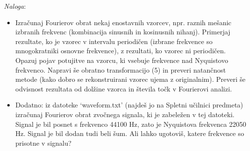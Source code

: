 \documentclass[slovene,11pt,a4paper]{article}
\begin{document}
{\it Naloga\/}:
\begin{itemize}

\item Izračunaj Fourierov obrat nekaj enostavnih vzorcev, npr. raznih mešanic izbranih frekvenc
(kombinacija sinusnih in kosinusnih nihanj). Primerjaj rezultate, ko je vzorec v intervalu periodičen
(izbrane frekvence so mnogokratniki osnovne frekvence), z rezultati, ko vzorec ni periodičen.
Opazuj pojav potujitve na vzorcu, ki vsebuje frekvence nad Nyquistovo frekvenco. Napravi še obratno
transformacijo (5) in preveri natančnost metode (kako dobro se rekonstruirani vzorec ujema z originalnim).
Preveri še odvisnost rezultata od dolžine vzorca in števila točk v Fourierovi analizi.
\item Dodatno: iz datoteke `waveform.txt' (najdeš jo na Spletni učilnici predmeta) izračunaj
Fourierov obrat zvočnega signala, ki je zabeležen v tej datoteki. Signal je bil posnet s frekvenco
44100 Hz, zato je Nyquistova frekvenca 22050 Hz. Signal je bil dodan tudi beli šum. Ali lahko ugotoviš,
katere frekvence so prisotne v signalu?



\end{itemize}
\end{document}
